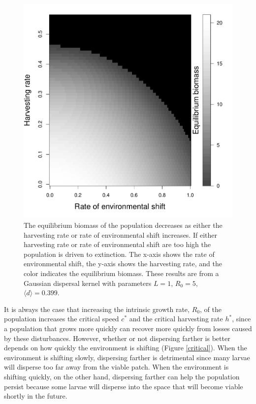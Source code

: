\documentclass[]{article}
\begin{document}
\begin{figure}[htbp]
\begin{center}
\includegraphics[width=.5\textwidth]{plots/eqbiomass.pdf}
\caption{The equilibrium biomass of the population decreases as either the harvesting rate or rate of environmental shift increases.  If either harvesting rate or rate of environmental shift are too high the population is driven to extinction. The x-axis shows the rate of environmental shift, the y-axis shows the harvesting rate, and the color indicates the equilibrium biomass.   These results are from a Gaussian dispersal kernel with parameters $L=1$, $R_0=5$, $\langle d \rangle = 0.399$.}
\label{eqbiomass}
\end{center}
\end{figure}

It is always the case that increasing the intrinsic growth rate, $R_0$, of the population increases the critical 
speed $c^*$ and the critical harvesting rate $h^*$, since a population that grows more quickly can recover 
more quickly from losses caused by these disturbances. However, whether or not dispersing farther is better 
depends on how quickly the environment is shifting (Figure \ref{critical}). When the environment is shifting 
slowly, dispersing farther is detrimental since many larvae will disperse too far away from the viable patch. 
When the environment is shifting quickly, on the other hand, dispersing farther can help the population persist 
because some larvae will disperse into the space that will become viable shortly in the future.
\end{document}
